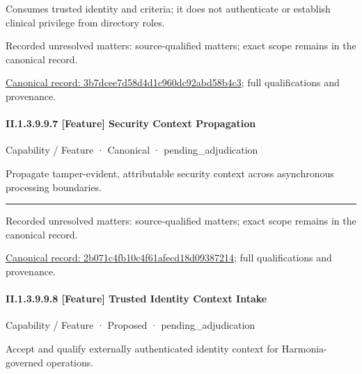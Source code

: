 Consumes trusted identity and criteria; it does not authenticate or establish clinical privilege from directory roles.


{\small Recorded unresolved matters: source-qualified matters; exact scope remains in the canonical record.}\par
{\footnotesize \href{../../../../continuum/strategy/capability/feature/3b7dcee7d58d4d1c960dc92abd58b4c3.md}{Canonical record: 3b7dcee7d58d4d1c960dc92abd58b4c3}; full qualifications and provenance.}\par
\paragraph*{II.1.3.9.9.7 [Feature] Security Context Propagation}
\label{navigation:II.1.3.9.9.7}

\label{element:2b071c4fb10c4f61afecd18d09387214}
{\small Capability / Feature · Canonical · pending\_adjudication}\par

Propagate tamper-evident, attributable security context across asynchronous processing boundaries.



\medskip\hrule\medskip

{\small Recorded unresolved matters: source-qualified matters; exact scope remains in the canonical record.}\par
{\footnotesize \href{../../../../continuum/strategy/capability/feature/2b071c4fb10c4f61afecd18d09387214.md}{Canonical record: 2b071c4fb10c4f61afecd18d09387214}; full qualifications and provenance.}\par
\paragraph*{II.1.3.9.9.8 [Feature] Trusted Identity Context Intake}
\label{navigation:II.1.3.9.9.8}

\label{element:2ef8f67907c34cb5a6a37fe7181434e2}
{\small Capability / Feature · Proposed · pending\_adjudication}\par

Accept and qualify externally authenticated identity context for Harmonia-governed operations.



